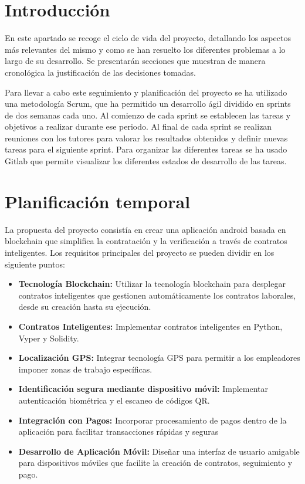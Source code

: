

\section{Introducción}

En este apartado se recoge el ciclo de vida del proyecto, detallando los aspectos más relevantes del mismo y como se han resuelto los diferentes problemas a lo largo de su desarrollo. Se presentarán secciones que muestran de manera cronológica la justificación de las decisiones tomadas.

Para llevar a cabo este seguimiento y planificación del proyecto se ha utilizado una metodología Scrum, que ha permitido un desarrollo ágil dividido en sprints de dos semanas cada uno. 
Al comienzo de cada sprint se establecen las tareas y objetivos a realizar durante ese periodo. Al final de cada sprint se realizan reuniones con los tutores para valorar los resultados obtenidos y definir nuevas tareas para el siguiente sprint.
Para organizar las diferentes tareas se ha usado Gitlab que permite visualizar los diferentes estados de desarrollo de las tareas.


\section{Planificación temporal}

La propuesta del proyecto consistía en crear una aplicación android basada en blockchain que simplifica la contratación y la verificación a través de contratos inteligentes.
Los requisitos principales del proyecto se pueden dividir en los siguiente puntos:

\begin{itemize}

\item \textbf{Tecnología Blockchain:} Utilizar la tecnología blockchain para desplegar contratos inteligentes que gestionen automáticamente los contratos laborales, desde su creación hasta su ejecución.

\item \textbf{Contratos Inteligentes:} Implementar contratos inteligentes en Python, Vyper y Solidity.

\item \textbf{Localización GPS:} Integrar tecnología GPS para permitir a los empleadores imponer zonas de trabajo específicas.

\item \textbf{Identificación segura mediante dispositivo móvil:} Implementar autenticación biométrica y el escaneo de códigos QR.

\item \textbf{Integración con Pagos:} Incorporar procesamiento de pagos dentro de la aplicación para facilitar transacciones rápidas y seguras

\item \textbf{Desarrollo de Aplicación Móvil:} Diseñar una interfaz de usuario amigable para dispositivos móviles que facilite la creación de contratos, seguimiento y pago.

\end{itemize}

